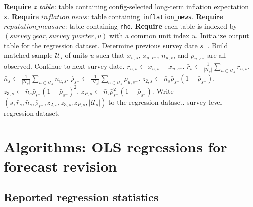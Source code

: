 \documentclass[11pt]{article}
\begin{document}
\begin{algorithm}[H]
\caption{\textsc{ConstructRegressionDataset}$(\textit{x\_table}, \textit{inflation\_news}, \textit{reputation\_measure})$}
\begin{algorithmic}[1]
\State \textbf{Require} $\textit{x\_table}$: table containing config-selected long-term inflation expectation \texttt{x}.
\State \textbf{Require} $\textit{inflation\_news}$: table containing \texttt{inflation\_news}.
\State \textbf{Require} $\textit{reputation\_measure}$: table containing \texttt{rho}.
\State \textbf{Require} each table is indexed by
\Statex \quad $(\textit{survey\_year}, \textit{survey\_quarter}, u)$ with a common unit index $u$.
\State Initialize output table for the regression dataset.
    \State Determine previous survey date $s^{-}$.
    \State Build matched sample $\mathcal{U}_s$ of units $u$ such that
    \Statex \quad $x_{u,s}$, $x_{u,s^{-}}$, $n_{u,s}$, and $\rho_{u,s^{-}}$ are all observed.
        \State Continue to next survey date.
    \EndIf
        \State $r_{u,s} \gets x_{u,s} - x_{u,s^{-}}$.
    \EndFor
    \State $\bar{r}_s \gets \frac{1}{|\mathcal{U}_s|}\sum_{u \in \mathcal{U}_s} r_{u,s}$.
    \State $\bar{n}_s \gets \frac{1}{|\mathcal{U}_s|}\sum_{u \in \mathcal{U}_s} n_{u,s}$.
    \State $\bar{\rho}_{s^{-}} \gets \frac{1}{|\mathcal{U}_s|}\sum_{u \in \mathcal{U}_s} \rho_{u,s^{-}}$.
    \State $z_{2,s} \gets \bar{n}_s \bar{\rho}_{s^{-}}\left(1-\bar{\rho}_{s^{-}}\right)$.
    \State $z_{3,s} \gets \bar{n}_s \bar{\rho}_{s^{-}}\left(1-\bar{\rho}_{s^{-}}\right)^2$.
    \State $z_{P,s} \gets \bar{n}_s \bar{\rho}_{s^{-}}^2\left(1-\bar{\rho}_{s^{-}}\right)$.
    \State Write $(s, \bar{r}_s, \bar{n}_s, \bar{\rho}_{s^{-}}, z_{2,s}, z_{3,s}, z_{P,s}, |\mathcal{U}_s|)$
    \Statex \quad to the regression dataset.
\EndFor
\State \Return survey-level regression dataset.
\end{algorithmic}
\end{algorithm}

\section{Algorithms: OLS regressions for forecast revision}

\subsection{Reported regression statistics}
\end{document}
